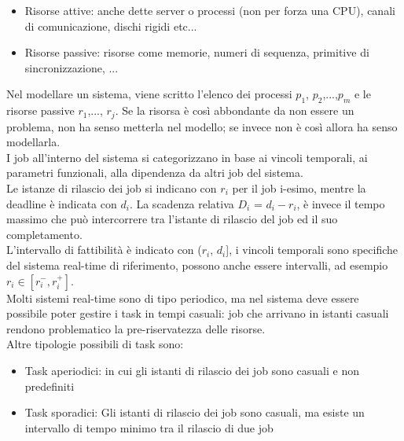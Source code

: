 \documentclass{article}
\begin{document}
\begin{itemize}
\item Risorse attive: anche dette server o processi (non per forza una CPU), canali di comunicazione, dischi rigidi etc...
\item Risorse passive: risorse come memorie, numeri di sequenza, primitive di sincronizzazione, ...
\end{itemize} 
Nel modellare un sistema, viene scritto l'elenco dei processi $p_1$, $p_2$,...,$p_m$ e le risorse passive $r_1$,..., $r_j$. Se la risorsa è così abbondante da non essere un problema, non ha senso metterla nel modello; se invece non è così allora ha senso modellarla.\\ I job all'interno del sistema si categorizzano in base ai vincoli temporali, ai parametri funzionali, alla dipendenza da altri job del sistema.\\ Le istanze di rilascio dei job si indicano con $r_i$ per il job i-esimo, mentre la deadline è indicata con $d_i$. La scadenza relativa $D_i$ = $d_i - r_i$, è invece il tempo massimo che può intercorrere tra l'istante di rilascio del job ed il suo completamento.\\ L'intervallo di fattibilità è indicato con ($r_i$, $d_i$], i vincoli temporali sono specifiche del sistema real-time di riferimento, possono anche essere intervalli, ad esempio $r_i \in [r_i^{-}, r_i^{+}]$.\\ Molti sistemi real-time sono di tipo periodico, ma nel sistema deve essere possibile poter gestire i task in tempi casuali: job che arrivano in istanti casuali rendono problematico la pre-riservatezza delle risorse.\\ Altre tipologie possibili di task sono:
\begin{itemize}
\item Task aperiodici: in cui gli istanti di rilascio dei job sono casuali e non predefiniti
\item Task sporadici: Gli istanti di rilascio dei job sono casuali, ma esiste un intervallo di tempo minimo tra il rilascio di due job
\end{itemize}
\end{document}
